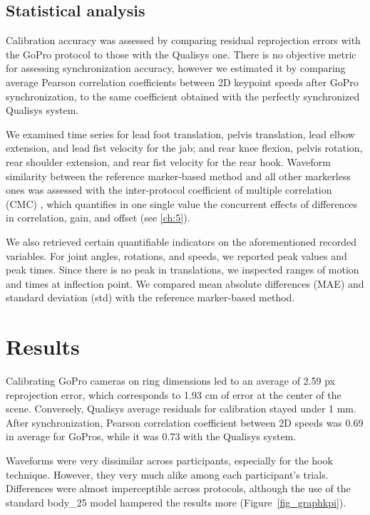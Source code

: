 \subsection{Statistical analysis}

Calibration accuracy was assessed by comparing residual reprojection errors with the GoPro protocol to those with the Qualisys one. There is no objective metric for assessing synchronization accuracy, however we estimated it by comparing average Pearson correlation coefficients between 2D keypoint speeds after GoPro synchronization, to the same coefficient obtained with the perfectly synchronized Qualisys system.

We examined time series for lead foot translation, pelvis translation, lead elbow extension, and lead fist velocity for the jab; and rear knee flexion, pelvis rotation, rear shoulder extension, and rear fist velocity for the rear hook. 
Waveform similarity between the reference marker-based method and all other markerless ones was assessed with the inter-protocol coefficient of multiple correlation (CMC) \cite{Ferrari2010}, which quantifies in one single value the concurrent effects of differences in correlation, gain, and offset (see  \autoref{ch:5}).

We also retrieved certain quantifiable indicators on the aforementioned recorded variables. For joint angles, rotations, and speeds, we reported peak values and peak times. Since there is no peak in translations, we inspected ranges of motion and times at inflection point. We compared mean absolute differences (MAE) and standard deviation (std) with the reference marker-based method. 


\newpage
\section{Results}

Calibrating GoPro cameras on ring dimensions led to an average of 2.59 px reprojection error, which corresponds to 1.93 cm of error at the center of the scene. Conversely, Qualisys average residuals for calibration stayed under 1 mm. After synchronization, Pearson correlation coefficient between 2D speeds was 0.69 in average for GoPros, while it was 0.73 with the Qualisys system. 

Waveforms were very dissimilar across participants, especially for the hook technique. However, they very much alike among each participant's trials. Differences were almost imperceptible across protocols, although the use of the standard body\_25 model hampered the results more (Figure~\ref{fig_graphkpi}).

